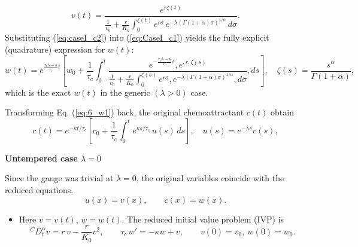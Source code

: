 \documentclass{article}
\begin{document}
\begin{description}
\begin{equation}\label{eq:caseI_c2}
v(t)=\frac{e^{r\zeta(t)}}{\displaystyle \frac{1}{v_0}+\frac{r}{K_0}\int_0^{\zeta(t)}e^{r\sigma}\,e^{-\lambda(\Gamma(1+\alpha)\sigma)^{1/\alpha}}\,d\sigma}.
\end{equation}
Substituting (\ref{eq:caseI_c2}) into (\ref{eq:CaseI_c1}) yields the fully explicit (quadrature) expression for $w(t)$:
\begin{equation}\label{eq:6_w1}
w(t)=e^{\frac{\tau_c\lambda-\kappa}{\tau_c} t}\!\left[
w_0+\frac{1}{\tau_c}\int_0^{t}
\frac{e^{-\frac{\tau_c\lambda-\kappa}{\tau_c} s},e^{,r,\zeta(s)}}
{\displaystyle \frac{1}{v_0}+\frac{r}{K_0}\int_0^{\zeta(s)} e^{r\sigma},e^{-\lambda(\Gamma(1+\alpha)\sigma)^{1/\alpha}},d\sigma},ds
\right],
\quad \zeta(s)=\frac{s^\alpha}{\Gamma(1+\alpha)},
\end{equation}
which is the exact $w(t)$ in the generic $(\lambda>0)$ case.
\par 
Transforming Eq. (\ref{eq:6_w1}) back, the original chemoattractant $c(t)$ obtain
\begin{equation}\label{eq:caseI_c}
c(t)=e^{-\kappa t/\tau_c}\left[c_0+\frac{1}{\tau_c}\int_0^t e^{\kappa s/\tau_c}\,u(s)\,ds\right],\quad u(s)=e^{-\lambda s}v(s),
\end{equation}
\item[(II)]  \textbf{Untempered case $\lambda=0$}
\par 
 Since the gauge was trivial at $\lambda =0$, the original variables coincide with the reduced equations.
 \begin{equation*}
u(x)=v(x),\qquad c(x)=w(x).
\end{equation*}
 \begin{itemize}
 \item[\textbf{II.A)}] Here $v=v(t)$, $w=w(t)$. The reduced initial value problem (IVP) is
 \begin{equation*}
{}^{C}D_t^\alpha v=r\,v-\frac{r}{K_0}v^2,\qquad
\tau_c\,w'=-\kappa w+v,\qquad v(0)=v_0,\ w(0)=w_0.
\end{equation*}


\end{itemize}
\end{description}
\end{document}
